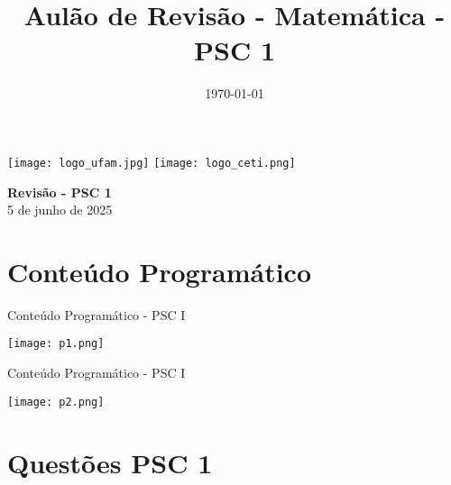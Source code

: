 \documentclass[aspectratio=169]{beamer}
\title[CETi Gilberto Mestrinho]{Aulão de Revisão - Matemática - PSC 1}
\date{\today}
\begin{document}
\justifying
\onehalfspacing

\begin{frame}
    \begin{titlepage}
    \centering
    \vspace*{1cm} %
    
    \noindent%
    \hspace*{0.3\paperwidth}%
    \texttt{[image: logo\_ufam.jpg]}%
    \hfill%
    \texttt{[image: logo\_ceti.png]}%
    \hspace*{0.3\paperwidth}%
    
    \vspace{0.1cm} %
    
    {\Large\textbf{Revisão - PSC 1}} \\ %
    \vspace{1cm}
    {\large 5 de junho de 2025} %
    
    \vfill %
    \end{titlepage}
\end{frame}

\section{Conteúdo Programático}

\begin{frame}{Conteúdo Programático - PSC I}

    \begin{center}
        \texttt{[image: p1.png]}
    \end{center}
    
\end{frame}

\begin{frame}{Conteúdo Programático - PSC I}

    \begin{center}
        \texttt{[image: p2.png]}
    \end{center}
    
\end{frame}

\section{Questões PSC 1}
\end{document}
